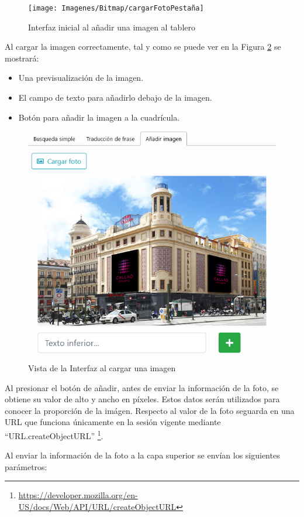 \begin{figure}[h!]
	\centering
	\texttt{[image: Imagenes/Bitmap/cargarFotoPestaña]}
	\caption{Interfaz inicial al añadir una imagen al tablero}
	\label{fig:cargarfotopestana}
\end{figure}


Al cargar la imagen correctamente, tal y como se puede ver en la Figura \ref{fig:addphotoitem} se mostrará: 

\begin{itemize}
	\item Una previsualización de la imagen.
	\item El campo de texto para añadirlo debajo de la imagen.
	\item Botón para añadir la imagen a la cuadrícula.
\end{itemize}

\begin{figure}[h!]
	\centering
	\includegraphics[width=0.7\linewidth]{Imagenes/Bitmap/addPhotoItem}
	\caption{ Vista de la Interfaz al cargar una imagen}
	\label{fig:addphotoitem}
\end{figure}



Al presionar el botón de añadir, antes de enviar la información de la foto, se obtiene su valor de alto y ancho en píxeles. Estos datos serán utilizados para conocer la proporción de la imágen. Respecto al valor de la foto seguarda en una URL que funciona únicamente en la sesión vigente mediante “URL.createObjectURL” \footnote{\url{https://developer.mozilla.org/en-US/docs/Web/API/URL/createObjectURL}}.

Al enviar la información de la foto a la capa superior se envían los siguientes parámetros: 

